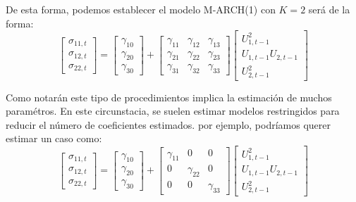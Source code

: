 \documentclass[
  a4paper,
]{article}
\begin{document}
De esta forma, podemos establecer el modelo M-ARCH(1) con \(K = 2\) será
de la forma: \begin{equation*}
    \begin{bmatrix}
    \sigma_{11, t} \\ \sigma_{12, t} \\ \sigma_{22, t}
    \end{bmatrix} =
    \begin{bmatrix}
    \gamma_{10} \\ \gamma_{20} \\ \gamma_{30}
    \end{bmatrix} +
    \begin{bmatrix}
    \gamma_{11} & \gamma_{12} & \gamma_{13} \\ \gamma_{21} & \gamma_{22} & \gamma_{23} \\ \gamma_{31} & \gamma_{32} & \gamma_{33}
    \end{bmatrix} 
    \begin{bmatrix}
    U^2_{1, t-1} \\ U_{1, t-1} U_{2, t-1} \\ U^2_{2, t-1}
    \end{bmatrix}
\end{equation*}

Como notarán este tipo de procedimientos implica la estimación de muchos
paramétros. En este circunstacia, se suelen estimar modelos restringidos
para reducir el número de coeficientes estimados. por ejemplo, podríamos
querer estimar un caso como: \begin{equation*}
    \begin{bmatrix}
    \sigma_{11, t} \\ \sigma_{12, t} \\ \sigma_{22, t}
    \end{bmatrix} =
    \begin{bmatrix}
    \gamma_{10} \\ \gamma_{20} \\ \gamma_{30}
    \end{bmatrix} +
    \begin{bmatrix}
    \gamma_{11} & 0 & 0 \\ 0 & \gamma_{22} & 0 \\ 0 & 0 & \gamma_{33}
    \end{bmatrix} 
    \begin{bmatrix}
    U^2_{1, t-1} \\ U_{1, t-1} U_{2, t-1} \\ U^2_{2, t-1}
    \end{bmatrix}
\end{equation*}
\end{document}
